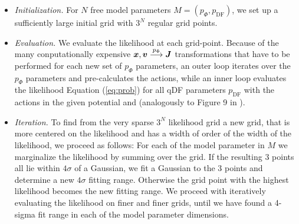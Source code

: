 \begin{itemize}

\item \emph{Initialization.} For $N$ free model parameters $M=(p_\Phi,p_\text{DF})$, we set up a sufficiently large initial grid with $3^N$ regular grid points.

\item  \emph{Evaluation.} We evaluate the likelihood at each grid-point. Because of the many conputationally expensive $\boldsymbol{x},\boldsymbol{v} \overset{p_\Phi}{\longrightarrow} \boldsymbol{J}$ transformations that have to be performed for each new set of $p_\Phi$ parameters, an outer loop iterates over the $p_\Phi$ parameters and pre-calculates the actions, while an inner loop evaluates the likelihood Equation (\ref{eq:prob}) for all qDF parameters $p_\text{DF}$ with the actions in the given potential and (analogously to Figure 9 in \citet{bov13}).

\item \emph{Iteration.} To find from the very sparse $3^N$ likelihood grid a new grid, that is more centered on the likelihood and has a width of order of the width of the likelihood, we proceed as follows: For each of the model parameter in $M$ we marginalize the likelihood by summing over the grid. If the resulting 3 points all lie within $4\sigma$ of a Gaussian, we fit a Gaussian to the 3 points and determine a new $4\sigma$ fitting range. Otherwise the grid point with the highest likelihood becomes the new fitting range. We proceed with iteratively evaluating the likelihood on finer and finer grids, until we have found a 4-sigma fit range in each of the model parameter dimensions.


\end{itemize}
